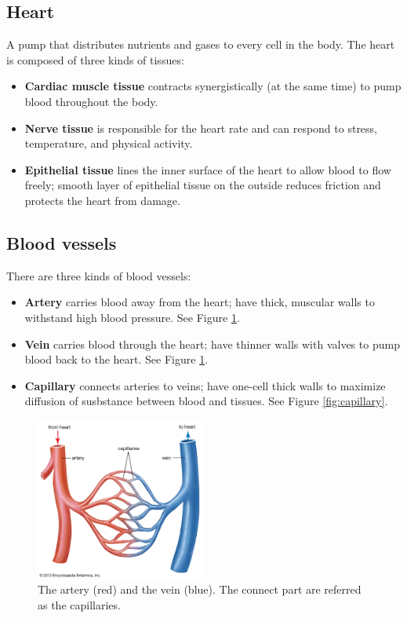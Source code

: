 \documentclass[12pt]{report}
\begin{document}
\subsection{Heart}
\begin{definition}[Heart]
    A pump that distributes nutrients and gases to every cell in the body. The heart is composed of three kinds of tissues: 
    \begin{itemize}
        \item{ \textbf{Cardiac muscle tissue} contracts synergistically (at the same time) to pump blood throughout the body.}
        \item{ \textbf{Nerve tissue} is responsible for the heart rate and can respond to stress, temperature, and physical activity.}
        \item{ \textbf{Epithelial tissue} lines the inner surface of the heart to allow blood to flow freely; smooth layer of epithelial tissue on the outside reduces friction and protects the heart from damage.}
    \end{itemize}
\end{definition}

\subsection{Blood vessels}
\begin{definition}
    There are three kinds of blood vessels: 
    \begin{itemize}
        \item{ \textbf{Artery} carries blood away from the heart; have thick, muscular walls to withstand high blood pressure. See Figure \ref{fig:artery}.}
        \item{ \textbf{Vein} carries blood through the heart; have thinner walls with valves to pump blood back to the heart. See Figure \ref{fig:artery}.}
        \item{ \textbf{Capillary} connects arteries to veins; have one-cell thick walls to maximize diffusion of susbstance between blood and tissues. See Figure \ref{fig:capillary}.}
    \end{itemize}
\end{definition}

\begin{figure}[H]
\centering
    \includegraphics[width=0.5\textwidth]{../figures/artery.png}
    \caption{The artery (red) and the vein (blue). The connect part are referred as the capillaries.}
    \label{fig:artery}
\end{figure}
\end{document}
